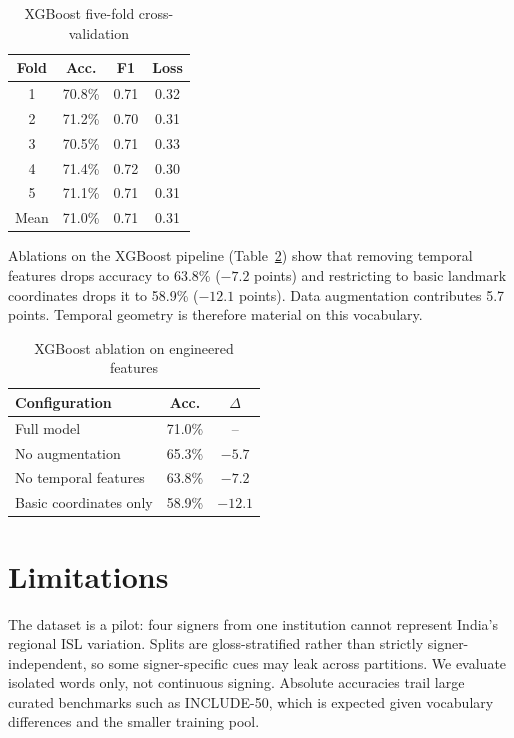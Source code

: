 \documentclass[conference]{IEEEtran}
\begin{document}
\begin{table}[t]
\centering
\caption{XGBoost five-fold cross-validation}
\label{tab:cv}
\begin{tabular}{@{}cccc@{}}
\toprule
Fold & Acc. & F1 & Loss \\
\midrule
1 & 70.8\% & 0.71 & 0.32 \\
2 & 71.2\% & 0.70 & 0.31 \\
3 & 70.5\% & 0.71 & 0.33 \\
4 & 71.4\% & 0.72 & 0.30 \\
5 & 71.1\% & 0.71 & 0.31 \\
\midrule
Mean & 71.0\% & 0.71 & 0.31 \\
\bottomrule
\end{tabular}
\end{table}

Ablations on the XGBoost pipeline (Table~\ref{tab:ablation}) show that removing temporal features drops accuracy to 63.8\% ($-7.2$ points) and restricting to basic landmark coordinates drops it to 58.9\% ($-12.1$ points). Data augmentation contributes 5.7 points. Temporal geometry is therefore material on this vocabulary.

\begin{table}[t]
\centering
\caption{XGBoost ablation on engineered features}
\label{tab:ablation}
\begin{tabular}{@{}lcc@{}}
\toprule
Configuration & Acc. & $\Delta$ \\
\midrule
Full model & 71.0\% & -- \\
No augmentation & 65.3\% & $-5.7$ \\
No temporal features & 63.8\% & $-7.2$ \\
Basic coordinates only & 58.9\% & $-12.1$ \\
\bottomrule
\end{tabular}
\end{table}

\section{Limitations}
The dataset is a pilot: four signers from one institution cannot represent India's regional ISL variation. Splits are gloss-stratified rather than strictly signer-independent, so some signer-specific cues may leak across partitions. We evaluate isolated words only, not continuous signing. Absolute accuracies trail large curated benchmarks such as INCLUDE-50, which is expected given vocabulary differences and the smaller training pool.
\end{document}
